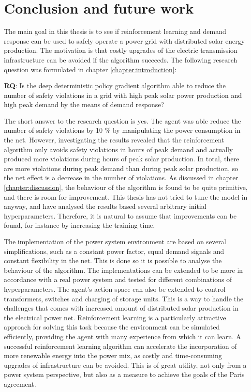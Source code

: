 \documentclass[class=book, crop=false, 11pt]{standalone}
\begin{document}
\chapter{Conclusion and future work}
The main goal in this thesis is to see if reinforcement learning and demand response can be used to safely operate a power grid with distributed solar energy production. The motivation is that costly upgrades of the electric transmission infrastructure can be avoided if the algorithm succeeds. The following research question was formulated in chapter \ref{chapter:introduction}: 

\begin{displayquote}
\textbf{RQ}: Is the deep deterministic policy gradient algorithm able to reduce the number of safety violations in a grid with high peak solar power production and high peak demand by the means of demand response? 
\end{displayquote}
The short answer to the research question is yes. The agent was able reduce the number of safety violations by 10 \% by manipulating the power consumption in the net. However, investigating the results revealed that the reinforcement algorithm only avoids safety violations in hours of peak demand and actually produced more violations during hours of peak solar production. In total, there are more violations during peak demand than during peak solar production, so the net effect is a decrease in the number of violations. As discussed in chapter \ref{chapter:discussion}, the behaviour of the algorithm is found to be quite primitive, and there is room for improvement. This thesis has not tried to tune the model in anyway, and have analysed the results based several arbitrary initial hyperparameters. Therefore, it is natural to assume that improvements can be found, for instance by increasing the training time. 

The implementation of the power system environment are based on several simplifications, such as a constant power factor, equal demand signals and constant flexibility in the net. This is done so it is possible to analyse the behaviour of the algorithm. The implementations can be extended to be more in accordance with a real power system and tested for different combinations of hyperparameters. The agent's action space can also be extended to control transformers, switches and charging of storage units. This is a way to handle the challenges that comes with increased amount of distributed solar production in the electrical power net. Reinforcement learning is a particularly attractive approach for solving this task because the environment can be simulated efficiently, providing the agent with many experience from which it can learn. A successful reinforcement learning algorithm can accelerate the incorporation of more renewable energy into the power mix, as costly and time-consuming upgrades of infrastructure can be avoided. This is of great utility, not only from a power system perspective, but also as a measure to achieve the goals of the Paris agreement.
\end{document}
